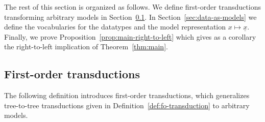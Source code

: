 The rest of this section is organized as follows. We define first-order transductions transforming arbitrary models in Section~\ref{sec:fo-transduction-def}. In Section~\ref{sec:data-as-models} we define the vocabularies for the  datatypes and the model representation $x \mapsto \underline x$. Finally, we prove Proposition~\ref{prop:main-right-to-left} which gives as a corollary the right-to-left implication of Theorem~\ref{thm:main}.

\subsection{First-order transductions}\label{sec:fo-transduction-def}
The following definition introduces first-order transductions, which generalizes tree-to-tree transductions given in Definition~\ref{def:fo-transduction} to arbitrary models.  

